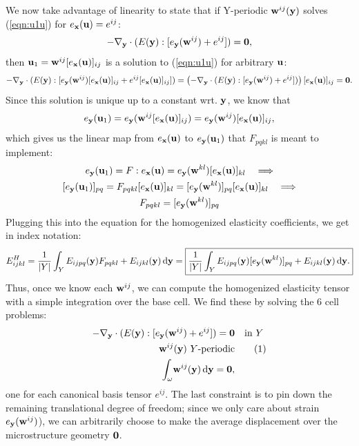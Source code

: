 \documentclass[10pt]{article}
\newcommand\numberthis{\addtocounter{equation}{1}\tag{\theequation}}
\begin{document}
We now take advantage of linearity to state that if Y-periodic ${\bf
w}^{ij}({\bf y})$ solves (\ref{eqn:u1u}) for $e_{\bf x}({\bf u}) = e^{ij}$:
\begin{equation}
-\nabla_{\bf y} \cdot (E({\bf y}) : [e_{\bf y}({\bf w}^{ij}) + e^{ij}]) = {\bf 0},
\end{equation}
then ${\bf u}_1 = {\bf w}^{ij} [e_{\bf x}({\bf u})]_{ij}$ is a solution to
(\ref{eqn:u1u}) for arbitrary ${\bf u}$:
$$
-\nabla_{\bf y} \cdot (E({\bf y}) : [e_{\bf y}({\bf w}^{ij})[e_{\bf x}({\bf u})]_{ij} + e^{ij}[e_{\bf x}({\bf u})]_{ij}]) =
\left(-\nabla_{\bf y} \cdot (E({\bf y}) : [e_{\bf y}({\bf w}^{ij}) + e^{ij}]) \right)[e_{\bf x}({\bf u})]_{ij} = {\bf 0}.
$$
Since this solution is unique up to a constant wrt. ${\bf y}$, we know that
$$
e_{\bf y}({\bf u}_1) = e_{\bf y}({\bf w}^{ij} [e_{\bf x}({\bf u})]_{ij}) = e_{\bf y}({\bf w}^{ij})[e_{\bf x}({\bf u})]_{ij},
$$
which gives us the linear map from $e_{\bf x}({\bf u})$ to $e_{\bf y}({\bf u}_1)$
that $F_{pqkl}$ is meant to implement:
\begin{gather*}
e_{\bf y}({\bf u}_1) = F : e_{\bf x}({\bf u}) = e_{\bf y}({\bf w}^{kl})[e_{\bf x}({\bf u})]_{kl} \quad \Longrightarrow \\
[e_{\bf y}({\bf u}_1)]_{pq} = F_{pqkl} [e_{\bf x}({\bf u})]_{kl} = [e_{\bf y}({\bf w}^{kl})]_{pq}[e_{\bf x}({\bf u})]_{kl} \quad \Longrightarrow \\
F_{pqkl} = [e_{\bf y}({\bf w}^{kl})]_{pq}
\end{gather*}
Plugging this into the equation for the homogenized elasticity coefficients, we get in index notation:
\begin{equation}
    \label{eqn:Eh}
E^H_{ijkl} = \frac{1}{|Y|} \int_Y E_{ijpq}({\bf y}) F_{pqkl} + E_{ijkl}({\bf y}) \, \mathrm{d} {\bf y}
= \boxed{\frac{1}{|Y|} \int_Y E_{ijpq}({\bf y}) [e_{\bf y}({\bf w}^{kl})]_{pq} + E_{ijkl}({\bf y}) \, \mathrm{d} {\bf y}.}
\end{equation}
Thus, once we know each ${\bf w}^{ij}$, we can compute the homogenized elasticity tensor
with a simple integration over the base cell. We find these by solving the 6 cell problems:
\begin{align*}
    -\nabla_{\bf y} \cdot (E({\bf y}) : [e_{\bf y}({\bf w}^{ij}) + e^{ij}]) = {\bf 0} & \quad \text{in } Y \\
    {\bf w}^{ij}({\bf y})\ Y \text{-periodic} &     \numberthis \label{eqn:cell} \\
    \int_\omega \! {\bf w}^{ij}({\bf y})  \, \mathrm{d} {\bf y} =  {\bf 0}, 
\end{align*}
one for each canonical basis tensor $e^{ij}$. The last constraint is to pin
down the remaining translational degree of freedom; since we only care about
strain $e_{\bf y}({\bf w}^{ij})$), we can arbitrarily choose to make the
average displacement over the microstructure geometry ${\bf 0}$.
\end{document}
